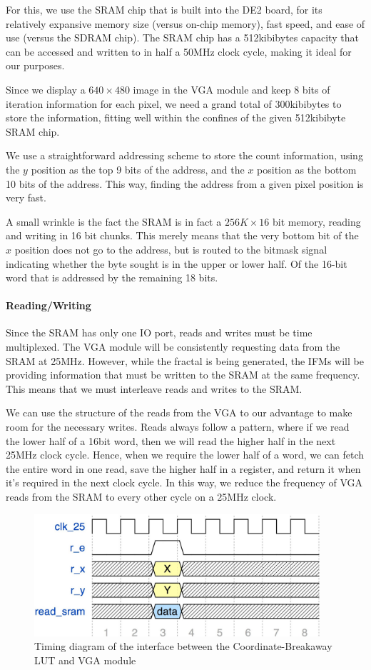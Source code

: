 \documentclass{article}
\begin{document}
For this, we use the SRAM chip that is built into the DE2 board, for
its relatively expansive memory size (versus on-chip memory), fast
speed, and ease of use (versus the SDRAM chip). The SRAM chip has a 
512kibibytes capacity that can be accessed and written to in half a 50MHz
clock cycle, making it ideal for our purposes.

Since we display a $640\times 480$ image in the VGA module and keep 8
bits of iteration information for each pixel, we need a grand total of
300kibibytes to store the information, fitting well within the
confines of the given 512kibibyte SRAM chip.

We use a straightforward addressing scheme to store the count
information, using the $y$ position as the top 9 bits of the address,
and the $x$ position as the bottom 10 bits of the address. This way,
finding the address from a given pixel position is very fast.

A small wrinkle is the fact the SRAM is in fact a $256K\times 16$ bit memory,
reading and writing in 16 bit chunks. This merely means that the very
bottom bit of the $x$ position does not go to the address, but is
routed to the bitmask signal indicating whether the byte sought is in the upper or lower half.
Of the 16-bit word that is addressed by the remaining 18 bits.

\paragraph{Reading/Writing}

Since the SRAM has only one IO port, reads and writes must be time
multiplexed. The VGA module will be consistently requesting data from the SRAM at 25MHz. However, while 
the fractal is being generated, the IFMs will be providing information that must be written to the SRAM 
at the same frequency. This means that we must interleave reads and writes to the SRAM.

We can use the structure of the reads from the VGA to our
advantage to make room for the necessary writes. Reads always follow a pattern, where
if we read the lower half of a 16bit word, then we will read the
higher half in the next 25MHz clock cycle. Hence, when we require the lower
half of a word, we can fetch the entire word in one read, save the
higher half in a register, and return it when it's required in
the next clock cycle. In this way, we reduce the frequency of VGA reads from the SRAM to every other cycle on a 
25MHz clock.

\begin{figure}[H]
  \centering
    \includegraphics[width=300pt]{timing_diagrams/clut_vga.pdf}
  \caption{Timing diagram of the interface between the Coordinate-Breakaway LUT and VGA module}
\end{figure}
\end{document}
